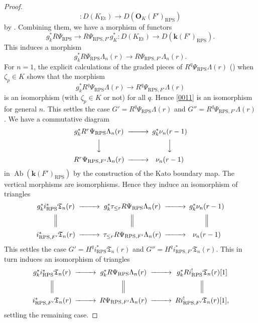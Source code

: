 \documentclass{amsart}
\theoremstyle{remark}
\numberwithin{equation}{section}
\newcommand{\Et}{\mathrm{Et}}
\newcommand{\alg}[1]{\mathbf{#1}}
\newcommand{\RPS}{\mathrm{RPS}}
\DeclareMathOperator{\Ab}{Ab}
\begin{document}
\begin{proof}
\[			\colon
				D(K_{\Et})
			\to
				D(\alg{O}_{K}(F')_{\RPS})
		\]
	by \cite[Proposition 2.6]{Suz21Imp}.
	Combining them, we have a morphism of functors
		\[
				g_{k}^{\ast} R \Psi_{\RPS}
			\to
				R \Psi_{\RPS, F'} g_{K}^{\ast}
			\colon
				D(K_{\Et})
			\to
				D(\alg{k}(F')_{\RPS}).
		\]
	This induces a morphism
		\begin{equation} \label{0011}
				g_{k}^{\ast} R \Psi_{\RPS} \Lambda_{n}(r)
			\to
				R \Psi_{\RPS, F'} \Lambda_{n}(r).
		\end{equation}
	For $n = 1$, the explicit calculations of the graded pieces of
	$R^{q} \Psi_{\RPS} \Lambda(r)$ (\cite[(6.3.1), (6.3.2)]{Suz24}) when $\zeta_{p} \in K$
	shows that the morphism
		\[
				g_{k}^{\ast} R^{q} \Psi_{\RPS} \Lambda(r)
			\to
				R^{q} \Psi_{\RPS, F'} \Lambda(r)
		\]
	is an isomorphism (with $\zeta_{p} \in K$ or not) for all $q$.
	Hence \eqref{0011} is an isomorphism for general $n$.
	This settles the case
	$G' = R^{q} \Psi_{\RPS} \Lambda(r)$ and $G'' = R^{q} \Psi_{\RPS, F'} \Lambda(r)$.
	We have a commutative diagram
		\[
			\begin{CD}
					g_{k}^{\ast} R^{r} \Psi_{\RPS} \Lambda_{n}(r)
				@>>>
					g_{k}^{\ast} \nu_{n}(r - 1)
				\\ @VVV @VVV \\
					R^{r} \Psi_{\RPS, F'} \Lambda_{n}(r)
				@>>>
					\nu_{n}(r - 1)
			\end{CD}
		\]
	in $\Ab(\alg{k}(F')_{\RPS})$ by the construction of the Kato boundary map.
	The vertical morphisms are isomorphisms.
	Hence they induce an isomorphism of triangles
		\[
			\begin{CD}
					g_{k}^{\ast} i_{\RPS}^{\ast} \mathfrak{T}_{n}(r)
				@>>>
					g_{k}^{\ast} \tau_{\le r} R \Psi_{\RPS} \Lambda_{n}(r)
				@>>>
					g_{k}^{\ast} \nu_{n}(r - 1)
				\\ @| @| @| \\
					i_{\RPS, F'}^{\ast} \mathfrak{T}_{n}(r)
				@>>>
					\tau_{\le r} R \Psi_{\RPS, F'} \Lambda_{n}(r)
				@>>>
					\nu_{n}(r - 1)
			\end{CD}
		\]
	This settles the case
	$G' = H^{q} i_{\RPS}^{\ast} \mathfrak{T}_{n}(r)$ and
	$G'' = H^{q} i_{\RPS, F'}^{\ast} \mathfrak{T}_{n}(r)$.
	This in turn induces an isomorphism of triangles
		\[
			\begin{CD}
					g_{k}^{\ast} i_{\RPS}^{\ast} \mathfrak{T}_{n}(r)
				@>>>
					g_{k}^{\ast} R \Psi_{\RPS} \Lambda_{n}(r)
				@>>>
					g_{k}^{\ast} R i_{\RPS}^{!} \mathfrak{T}_{n}(r)[1]
				\\ @| @| @| \\
					i_{\RPS, F'}^{\ast} \mathfrak{T}_{n}(r)
				@>>>
					R \Psi_{\RPS, F'} \Lambda_{n}(r)
				@>>>
					R i_{\RPS, F'}^{!} \mathfrak{T}_{n}(r)[1],
			\end{CD}
		\]
	settling the remaining case.
\end{proof}
\end{document}
